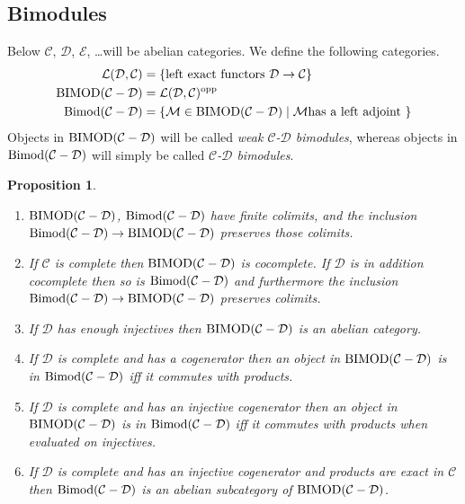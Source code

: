 \documentclass{amsproc}
\def\Cscr{{\mathcal C}}
\def\Dscr{{\mathcal D}}
\def\Escr{{\mathcal E}}
\def\Lscr{{\mathcal L}}
\def\Mscr{{\mathcal M}}
\def\Bimod{\mathop{\text{Bimod}}}
\def\BIMOD{\mathop{\text{BIMOD}}}
\def\r{\rightarrow}
\let\oldtext\text
\def\text#1{\oldtext{\upshape #1}}
\newtheorem{propositions}[lemmas]{Proposition}
\theoremstyle{definition}
\theoremstyle{remark}
\numberwithin{equation}{section}
\numberwithin{table}{section}
\numberwithin{figure}{section}
\begin{document}
\subsection{Bimodules}
\label{ref:3.1a}
Below $\Cscr$, $\Dscr$, $\Escr$, \dots will be abelian categories. We
define the following categories.
\begin{align*}
  \Lscr(\Dscr,\Cscr)&=\{\text{left exact functors $\Dscr\r \Cscr$}\}
  \\ \BIMOD(\Cscr-\Dscr)&=\Lscr(\Dscr,\Cscr)^{\text{opp}}\\ 
  \Bimod(\Cscr-\Dscr)&=\{\Mscr\in\BIMOD(\Cscr-\Dscr)\mid \Mscr\text{
    has a left adjoint }\}
\end{align*}
Objects in $\BIMOD(\Cscr-\Dscr)$ will be called \emph{weak
  $\Cscr$-$\Dscr$ bimodules}, whereas objects in $\Bimod(\Cscr-\Dscr)$
will simply be called \emph{$\Cscr$-$\Dscr$ bimodules}.
\begin{propositions}
\label{ref:3.1.1a}
\begin{enumerate}
\item $\BIMOD(\Cscr-\Dscr)$, $\Bimod(\Cscr-\Dscr)$ have finite
  colimits, and the inclusion $\Bimod(\Cscr-\Dscr)\r
  \BIMOD(\Cscr-\Dscr)$ preserves those colimits.
\item If $\Cscr$ is complete then $\BIMOD(\Cscr-\Dscr)$ is cocomplete.
  If $\Dscr$ is in addition cocomplete then so is  $\Bimod(\Cscr-\Dscr)$
and furthermore  the inclusion $\Bimod(\Cscr-\Dscr)\r
  \BIMOD(\Cscr-\Dscr)$ preserves colimits.
\item If $\Dscr$ has enough injectives then $\BIMOD(\Cscr-\Dscr)$ is
  an abelian category.
\item If $\Dscr$ is complete and has a cogenerator then an object in
  $\BIMOD(\Cscr-\Dscr)$ is in $\Bimod(\Cscr-\Dscr)$ iff it commutes
  with products.
\item If $\Dscr$ is complete and has an injective cogenerator then an
  object in $\BIMOD(\Cscr-\Dscr)$ is in $\Bimod(\Cscr-\Dscr)$ iff it
  commutes with products when evaluated on injectives.
\item If $\Dscr$ is complete and has an injective cogenerator and
  products are exact in $\Cscr$ then $\Bimod(\Cscr-\Dscr)$ is an
  abelian subcategory of $\BIMOD(\Cscr-\Dscr)$.
\end{enumerate}
\end{propositions}
\end{document}

